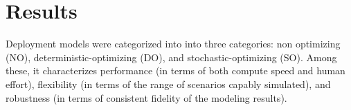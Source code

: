 \section{Results}
Deployment models were categorized into into three categories: non optimizing 
(NO), deterministic-optimizing (DO), and stochastic-optimizing (SO). Among 
these, it characterizes performance (in terms of both compute speed and human 
effort), flexibility (in terms of the range of scenarios capably simulated), 
and robustness (in terms of consistent fidelity of the modeling results).


